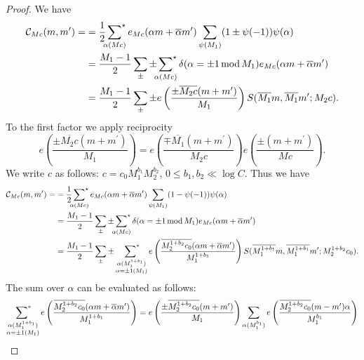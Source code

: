 \documentclass[12pt,a4paper,twoside, reqno]{amsart}
\newcommand{\sumstar}{\sideset{}{^*}\sum}
\begin{document}
\begin{proof} We have 
    \begin{align*}
    \mathcal{C}_{Mc}(m,m^\prime)=&= \frac{1}{2}\sideset{}{^\star}{\sum}_{\alpha (Mc)}  e_{Mc}(\alpha m+\overline{\alpha} m^\prime) \sum_{\psi(M_1)} (1 \pm{}\psi(-1))\psi(\alpha) \\
  &= \frac{M_1-1}{2} \sum_{\pm}\pm\sideset{}{^\star}{\sum}_{\alpha (Mc)}\delta(\alpha=\pm 1 \, \mathrm{mod}\, M_1) e_{Mc}(\alpha m+\overline{\alpha} m^\prime) \\
  &= \frac{M_1-1}{2} \sum_{\pm}\pm e\left(\frac{\pm\overline{M_2c}(m+m^\prime)}{M_1} \right) S(\overline{M_1} m, \overline{M_1}m^\prime;M_2c).
\end{align*}
To the first factor we apply reciprocity 
\[ e\left(\frac{\pm\overline{M_2c}(m+m^\prime)}{M_1} \right)= e\left(\frac{\mp\overline{M_1}(m+m^\prime)}{M_2c} \right) e\left(\frac{\pm(m+m^\prime)}{Mc} \right).\]
We write $c$  as follows: $ c=c_0M_1^{b_1} M_2^{b_2} $, $ 0 \leq b_1, b_2 \ll  \log C $.   
Thus we have 
\begin{align*}
    \mathcal{C}_{Mc}(m,m^\prime)=&= \frac{1}{2}\sideset{}{^\star}{\sum}_{\alpha (Mc)}  e_{Mc}(\alpha m+\overline{\alpha} m^\prime) \sum_{\psi(M_1)} (1-\psi(-1))\psi(\alpha) \\
  &= \frac{M_1-1}{2} \sum_{\pm}\pm\sideset{}{^\star}{\sum}_{\alpha (Mc)}\delta(\alpha=\pm 1 \, \mathrm{mod}\, M_1) e_{Mc}(\alpha m+\overline{\alpha} m^\prime) \\
  &= \frac{M_1-1}{2} \sum_{\pm}\pm \mathop{\sumstar}_{\substack{\alpha (M_1^{1+b_1})  \\  \alpha = \pm 1 (M_1)}} e\left(\frac{\overline{M_2^{1+b_2}c_0}( \alpha m+\overline{\alpha } m^\prime)}{M_1^{1+b_1}} \right) S(\overline{M_1^{1+b_1}} m, \overline{M_1^{1+b_1}}m^\prime;M_2^{1+b_2}c_0).
\end{align*}
The sum over $\alpha$ can be evaluated as follows: 
\[ \mathop{\sumstar}_{\substack{\alpha (M_1^{1+b_1})  \\  \alpha = \pm 1 (M_1)}} e\left(\frac{ \overline{M_2^{1+b_2}c_0}( \alpha m+\overline{\alpha } m^\prime)}{M_1^{1+b_1}} \right) = e\left(\frac{\pm\overline{M_2^{1+b_2}c_0}(m+m^\prime)}{M_1} \right) \mathop{\sum}_{\substack{\alpha (M_1^{b_1})  }} e\left(\frac{ \overline{M_2^{1+b_2}c_0} (  m- m^\prime) \alpha}{M_1^{b_1}} \right) \]


\end{proof}
\end{document}
